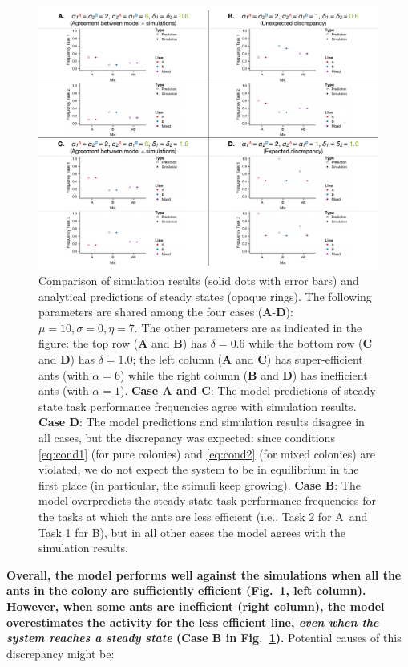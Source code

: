 \documentclass[10pt]{article}
\theoremstyle{remark}
\newcommand{\A}{{\color{red}A}}
\newcommand{\B}{{\color{blue}B}}
\begin{document}
\begin{figure}[H]
    \centering
    \includegraphics[trim={0 0.25in 0 0.2in}, clip, width=0.9\linewidth]{5050_comparison.pdf}
    \caption{Comparison of simulation results (solid dots with error bars) and analytical predictions of steady states (opaque rings). The following parameters are shared among the four cases (\textbf{A}-\textbf{D}): $\mu = 10, \sigma = 0, \eta = 7$. The other parameters are as indicated in the figure: the top row (\textbf{A} and \textbf{B}) has $\delta = 0.6$ while the bottom row (\textbf{C} and \textbf{D}) has $\delta = 1.0$; the left column (\textbf{A} and \textbf{C}) has super-efficient ants (with $\alpha = 6$) while the right column (\textbf{B} and \textbf{D}) has inefficient ants (with $\alpha = 1$). \textbf{Case A and C}: The model predictions of steady state task performance frequencies agree with simulation results. \textbf{Case D}: The model predictions and simulation results disagree in all cases, but the discrepancy was expected: since conditions \eqref{eq:cond1} (for pure colonies) and \eqref{eq:cond2} (for mixed colonies) are violated, we do not expect the system to be in equilibrium in the first place (in particular, the stimuli keep growing). \textbf{Case B}: The model overpredicts the steady-state task performance frequencies for the tasks at which the ants are less efficient (i.e., Task 2 for \A\ and Task 1 for \B), but in all other cases the model agrees with the simulation results.}
    \label{fig:5050_comp}
\end{figure}
\vspace{-5pt}
\textbf{Overall, the model performs well against the simulations when all the ants in the colony are sufficiently efficient (Fig.~\ref{fig:5050_comp}, left column). However, when some ants are inefficient (right column), the model overestimates the activity for the less efficient line, \textit{even when the system reaches a steady state} (\textbf{Case B} in Fig.~\ref{fig:5050_comp}).} Potential causes of this discrepancy might be:
\end{document}
